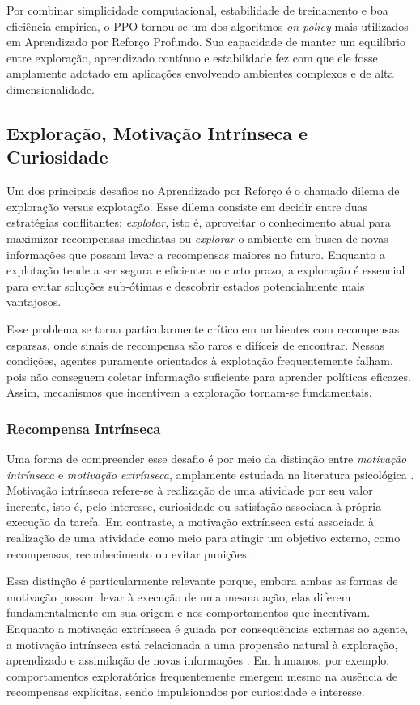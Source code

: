 Por combinar simplicidade computacional, estabilidade de treinamento e boa eficiência empírica, o PPO tornou-se um dos algoritmos \textit{on-policy} mais utilizados em Aprendizado por Reforço Profundo. Sua capacidade de manter um equilíbrio entre exploração, aprendizado contínuo e estabilidade fez com que ele fosse amplamente adotado em aplicações envolvendo ambientes complexos e de alta dimensionalidade.

\subsection{Exploração, Motivação Intrínseca e Curiosidade}

Um dos principais desafios no Aprendizado por Reforço é o chamado dilema de exploração versus explotação. Esse dilema consiste em decidir entre duas estratégias conflitantes: \textit{explotar}, isto é, aproveitar o conhecimento atual para maximizar recompensas imediatas ou \textit{explorar} o ambiente em busca de novas informações que possam levar a recompensas maiores no futuro. Enquanto a explotação tende a ser segura e eficiente no curto prazo, a exploração é essencial para evitar soluções sub-ótimas e descobrir estados potencialmente mais vantajosos.

Esse problema se torna particularmente crítico em ambientes com recompensas esparsas, onde sinais de recompensa são raros e difíceis de encontrar. Nessas condições, agentes puramente orientados à explotação frequentemente falham, pois não conseguem coletar informação suficiente para aprender políticas eficazes. Assim, mecanismos que incentivem a exploração tornam-se fundamentais.

\subsubsection{Recompensa Intrínseca}

Uma forma de compreender esse desafio é por meio da distinção entre \textit{motivação intrínseca} e \textit{motivação extrínseca}, amplamente estudada na literatura psicológica \cite{intrinsic}. Motivação intrínseca refere-se à realização de uma atividade por seu valor inerente, isto é, pelo interesse, curiosidade ou satisfação associada à própria execução da tarefa. Em contraste, a motivação extrínseca está associada à realização de uma atividade como meio para atingir um objetivo externo, como recompensas, reconhecimento ou evitar punições.

Essa distinção é particularmente relevante porque, embora ambas as formas de motivação possam levar à execução de uma mesma ação, elas diferem fundamentalmente em sua origem e nos comportamentos que incentivam. Enquanto a motivação extrínseca é guiada por consequências externas ao agente, a motivação intrínseca está relacionada a uma propensão natural à exploração, aprendizado e assimilação de novas informações . Em humanos, por exemplo, comportamentos exploratórios frequentemente emergem mesmo na ausência de recompensas explícitas, sendo impulsionados por curiosidade e interesse.

